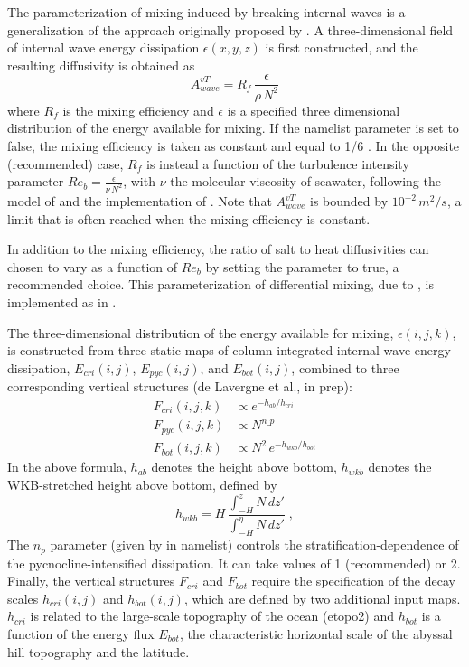 \documentclass[../main/NEMO_manual]{subfiles}
\begin{document}
%

The parameterization of mixing induced by breaking internal waves is a generalization of
the approach originally proposed by \citet{St_Laurent_al_GRL02}.
A three-dimensional field of internal wave energy dissipation $\epsilon(x,y,z)$ is first constructed,
and the resulting diffusivity is obtained as 
\[
  A^{vT}_{wave} =  R_f \,\frac{ \epsilon }{ \rho \, N^2 }
\]
where $R_f$ is the mixing efficiency and $\epsilon$ is a specified three dimensional distribution of
the energy available for mixing.
If the  namelist parameter is set to false, the mixing efficiency is taken as constant and
equal to 1/6 \citep{Osborn_JPO80}.
In the opposite (recommended) case, $R_f$ is instead a function of
the turbulence intensity parameter $Re_b = \frac{ \epsilon}{\nu \, N^2}$,
with $\nu$ the molecular viscosity of seawater, following the model of \cite{Bouffard_Boegman_DAO2013} and
the implementation of \cite{de_lavergne_JPO2016_efficiency}.
Note that $A^{vT}_{wave}$ is bounded by $10^{-2}\,m^2/s$, a limit that is often reached when
the mixing efficiency is constant.

In addition to the mixing efficiency, the ratio of salt to heat diffusivities can chosen to vary 
as a function of $Re_b$ by setting the  parameter to true, a recommended choice. 
This parameterization of differential mixing, due to \cite{Jackson_Rehmann_JPO2014},
is implemented as in \cite{de_lavergne_JPO2016_efficiency}.

The three-dimensional distribution of the energy available for mixing, $\epsilon(i,j,k)$,
is constructed from three static maps of column-integrated internal wave energy dissipation,
$E_{cri}(i,j)$, $E_{pyc}(i,j)$, and $E_{bot}(i,j)$, combined to three corresponding vertical structures
(de Lavergne et al., in prep):
\begin{align*}
  F_{cri}(i,j,k) &\propto e^{-h_{ab} / h_{cri} }\\
  F_{pyc}(i,j,k) &\propto N^{n\_p}\\
  F_{bot}(i,j,k) &\propto N^2 \, e^{- h_{wkb} / h_{bot} }
\end{align*} 
In the above formula, $h_{ab}$ denotes the height above bottom,
$h_{wkb}$ denotes the WKB-stretched height above bottom, defined by
\[
  h_{wkb} = H \, \frac{ \int_{-H}^{z} N \, dz' } { \int_{-H}^{\eta} N \, dz'  } \; ,
\]
The $n_p$ parameter (given by  in  namelist)
controls the stratification-dependence of the pycnocline-intensified dissipation.
It can take values of 1 (recommended) or 2.
Finally, the vertical structures $F_{cri}$ and $F_{bot}$ require the specification of
the decay scales $h_{cri}(i,j)$ and $h_{bot}(i,j)$, which are defined by two additional input maps.
$h_{cri}$ is related to the large-scale topography of the ocean (etopo2) and
$h_{bot}$ is a function of the energy flux $E_{bot}$, the characteristic horizontal scale of
the abyssal hill topography \citep{Goff_JGR2010} and the latitude.


\biblio
\end{document}

